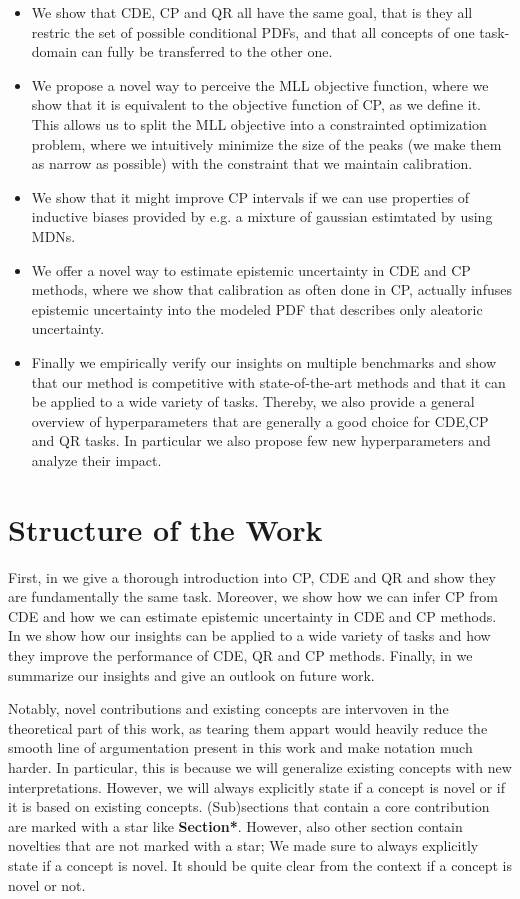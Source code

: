 \begin{itemize}
    \item We show that CDE, CP and QR all have the same goal, that is they all restric the set of possible conditional PDFs, and that all concepts of one task-domain can fully be transferred to the other one.
    \item We propose a novel way to perceive the MLL objective function, where we show that it is equivalent to the objective function of CP, as we define it. This allows us to split the MLL objective into a constrainted optimization problem, where we intuitively minimize the size of the peaks (we make them as narrow as possible) with the constraint that we maintain calibration.
    \item We show that it might improve CP intervals if we can use properties of inductive biases provided by e.g. a mixture of gaussian estimtated by using MDNs.
    \item We offer a novel way to estimate epistemic uncertainty in CDE and CP methods, where we show that calibration as often done in CP, actually infuses epistemic uncertainty into the modeled PDF that describes only aleatoric uncertainty.
    \item Finally we empirically verify our insights on multiple benchmarks and show that our method is competitive with state-of-the-art methods and that it can be applied to a wide variety of tasks. Thereby, we also provide a general overview of hyperparameters that are generally a good choice for CDE,CP and QR tasks. In particular we also propose few new hyperparameters and analyze their impact.
\end{itemize}

\section{Structure of the Work}\label{sec:structure}

First, in  we give a thorough introduction into CP, CDE and QR and show they are fundamentally the same task. Moreover, we show how we can infer CP from CDE and how we can estimate epistemic uncertainty in CDE and CP methods. In  we show how our insights can be applied to a wide variety of tasks and how they improve the performance of CDE, QR and CP methods. Finally, in  we summarize our insights and give an outlook on future work.

Notably, novel contributions and existing concepts are intervoven in the theoretical part of this work, as tearing them appart would heavily reduce the smooth line of argumentation present in this work and make notation much harder. In particular, this is because we will generalize existing concepts with new interpretations. However, we will always explicitly state if a concept is novel or if it is based on existing concepts. (Sub)sections that contain a core contribution are marked with a star like \textbf{Section*}. However, also other section contain novelties that are not marked with a star; We made sure to always explicitly state if a concept is novel. It should be quite clear from the context if a concept is novel or not.


